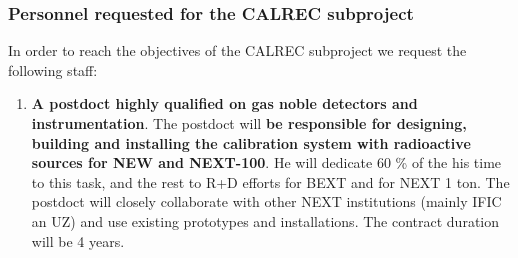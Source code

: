 %
%

\subsubsection*{Personnel requested for the CALREC subproject}

In order to reach the objectives of the CALREC subproject we request the following staff:

\begin{enumerate}

\item {\bf A postdoct highly qualified on gas noble detectors and instrumentation}. The postdoct will {\bf be responsible for designing, building and installing the calibration system with radioactive sources for NEW and NEXT-100}. He will dedicate 60 \% of the his time to this task, and the rest to R+D efforts for BEXT and for NEXT 1 ton. 
The postdoct will closely collaborate with other NEXT institutions (mainly IFIC an UZ) and use existing prototypes and installations. The contract duration will be 4 years.




\end{enumerate}
